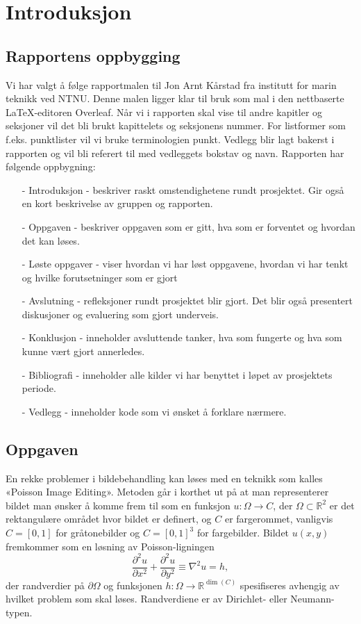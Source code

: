 \section{Introduksjon}


\subsection{Rapportens oppbygging}
Vi har valgt å følge rapportmalen til Jon Arnt Kårstad fra institutt for marin teknikk ved NTNU. Denne malen ligger klar til bruk som mal i den nettbaserte LaTeX-editoren Overleaf. Når vi i rapporten skal vise til andre kapitler og seksjoner vil det bli brukt kapittelets og seksjonens nummer. For listformer som f.eks. punktlister vil vi bruke terminologien punkt. Vedlegg blir lagt bakerst i rapporten og vil bli referert til med vedleggets bokstav og navn. Rapporten har følgende oppbygning:
\begin{itemize}
  \item[-] Introduksjon - beskriver raskt omstendighetene rundt prosjektet. Gir også en kort beskrivelse av gruppen og rapporten.
  \item[-] Oppgaven - beskriver oppgaven som er gitt, hva som er forventet og hvordan det kan løses.
  \item[-] Løste oppgaver - viser hvordan vi har løst oppgavene, hvordan vi har tenkt og hvilke forutsetninger som er gjort
  \item[-] Avslutning - refleksjoner rundt prosjektet blir gjort. Det blir også presentert diskusjoner og evaluering som gjort underveis.
  \item[-] Konklusjon - inneholder avsluttende tanker, hva som fungerte og hva som kunne vært gjort annerledes.
  \item[-] Bibliografi - inneholder alle kilder vi har benyttet i løpet av prosjektets periode.
  \item[-] Vedlegg - inneholder kode som vi ønsket å forklare nærmere.
\end{itemize}

\subsection{Oppgaven}
En rekke problemer i bildebehandling kan løses med en teknikk som kalles «Poisson Image Editing». Metoden går i korthet ut på at man representerer bildet man ønsker å komme frem til som en funksjon $u : \Omega \to C$, der $\Omega \subset \mathbb{R}^2$ er det rektangulære området hvor bildet er definert, og $C$ er fargerommet, vanligvis $C = [0, 1]$ for gråtonebilder og $C = [0, 1]^3$ for fargebilder. Bildet $u(x, y)$ fremkommer som en løsning av Poisson-ligningen
\begin{equation}
  \frac{\partial^2 u}{\partial x^2} + \frac{\partial^2 u}{\partial y^2} \equiv \nabla^2 u = h,
  \label{eq:poisson}
\end{equation}
der randverdier på $\partial\Omega$ og funksjonen $h : \Omega \to \mathbb{R}^{\dim(C)}$ spesifiseres avhengig av hvilket problem som skal løses. Randverdiene er av Dirichlet- eller Neumann-typen.

